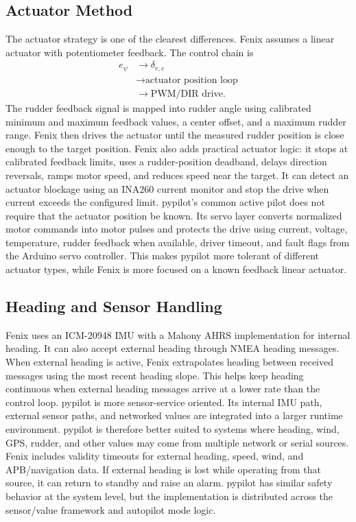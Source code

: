 \documentclass[10pt,twocolumn]{article}
\begin{document}
\subsection{Actuator Method}
The actuator strategy is one of the clearest differences.  Fenix assumes a
linear actuator with potentiometer feedback.  The control chain is
\[
\begin{aligned}
e_\psi
&\longrightarrow \delta_{r,c}\\
&\longrightarrow \text{actuator position loop}\\
&\longrightarrow \text{PWM/DIR drive}.
\end{aligned}
\]
The rudder feedback signal is mapped into rudder angle using calibrated
minimum and maximum feedback values, a center offset, and a maximum rudder
range.  Fenix then drives the actuator until the measured rudder position
is close enough to the target position.
Fenix also adds practical actuator logic: it stops at calibrated feedback
limits, uses a rudder-position deadband, delays direction reversals,
ramps motor speed, and reduces speed near the target.  It can detect an
actuator blockage using an INA260 current monitor and stop the drive when
current exceeds the configured limit.
pypilot's common active pilot does not require that the actuator position
be known.  Its servo layer converts normalized motor commands into motor
pulses and protects the drive using current, voltage, temperature, rudder
feedback when available, driver timeout, and fault flags from the Arduino
servo controller.  This makes pypilot more tolerant of different actuator
types, while Fenix is more focused on a known feedback linear actuator.
\subsection{Heading and Sensor Handling}
Fenix uses an ICM-20948 IMU with a Mahony AHRS implementation for internal
heading.  It can also accept external heading through NMEA heading
messages.  When external heading is active, Fenix extrapolates heading
between received messages using the most recent heading slope.  This helps
keep heading continuous when external heading messages arrive at a lower
rate than the control loop.
pypilot is more sensor-service oriented.  Its internal IMU path, external
sensor paths, and networked values are integrated into a larger runtime
environment.  pypilot is therefore better suited to systems where heading,
wind, GPS, rudder, and other values may come from multiple network or
serial sources.
Fenix includes validity timeouts for external heading, speed, wind, and
APB/navigation data.  If external heading is lost while operating from
that source, it can return to standby and raise an alarm.  pypilot has
similar safety behavior at the system level, but the implementation is
distributed across the sensor/value framework and autopilot mode logic.
\end{document}
